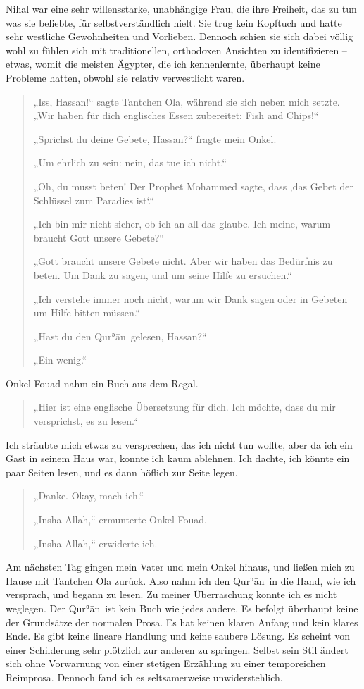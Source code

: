 \documentclass[12pt]{memoir}
\def\´{ʾ} %
\def \Quran{Qur\-\´ān} %
\begin{document}
Nihal war eine sehr willensstarke, unabhängige Frau, die ihre Freiheit,
das zu tun was sie beliebte, für selbstverständlich hielt.
Sie trug kein Kopftuch und hatte sehr westliche Gewohnheiten und Vorlieben.
Dennoch schien sie sich dabei völlig wohl zu fühlen sich mit traditionellen,
orthodoxen Ansichten zu identifizieren – etwas, womit die meisten Ägypter,
die ich kennenlernte, überhaupt keine Probleme hatten,
obwohl sie relativ verwestlicht waren.

\begin{quote}
„Iss, Hassan!“ sagte Tantchen Ola, während sie sich neben mich setzte.
„Wir haben für dich englisches Essen zubereitet: Fish and Chips!“

„Sprichst du deine Gebete, Hassan?“ fragte mein Onkel.

„Um ehrlich zu sein: nein, das tue ich nicht.“

„Oh, du musst beten! Der Prophet Mohammed sagte,
dass ‚das Gebet der Schlüssel zum Paradies ist‘.“

„Ich bin mir nicht sicher, ob ich an all das glaube.
Ich meine, warum braucht Gott unsere Gebete?“

„Gott braucht unsere Gebete nicht. Aber wir haben das Bedürfnis zu beten.
Um Dank zu sagen, und um seine Hilfe zu ersuchen.“

„Ich verstehe immer noch nicht,
warum wir Dank sagen oder in Gebeten um Hilfe bitten müssen.“

„Hast du den \Quran\ gelesen, Hassan?“

„Ein wenig.“
\end{quote}

Onkel Fouad nahm ein Buch aus dem Regal.

\begin{quote}
„Hier ist eine englische Übersetzung für dich.
Ich möchte, dass du mir versprichst, es zu lesen.“
\end{quote}

Ich sträubte mich etwas zu versprechen, das ich nicht tun wollte,
aber da ich ein Gast in seinem Haus war, konnte ich kaum ablehnen.
Ich dachte, ich könnte ein paar Seiten lesen,
und es dann höflich zur Seite legen.

\begin{quote}
„Danke. Okay, mach ich.“

„Insha-Allah,“ ermunterte Onkel Fouad.

„Insha-Allah,“ erwiderte ich.
\end{quote}

Am nächsten Tag gingen mein Vater und mein Onkel hinaus,
und ließen mich zu Hause mit Tantchen Ola zurück.
Also nahm ich den \Quran\ in die Hand, wie ich versprach, und begann zu lesen.
Zu meiner Überraschung konnte ich es nicht weglegen.
Der \Quran\ ist kein Buch wie jedes andere.
Es befolgt überhaupt keine der Grundsätze der normalen Prosa.
Es hat keinen klaren Anfang und kein klares Ende.
Es gibt keine lineare Handlung und keine saubere Lösung.
Es scheint von einer Schilderung sehr plötzlich zur anderen zu springen.
Selbst sein Stil ändert sich ohne Vorwarnung von einer stetigen Erzählung
zu einer temporeichen Reimprosa.
Dennoch fand ich es seltsamerweise unwiderstehlich.
\end{document}
